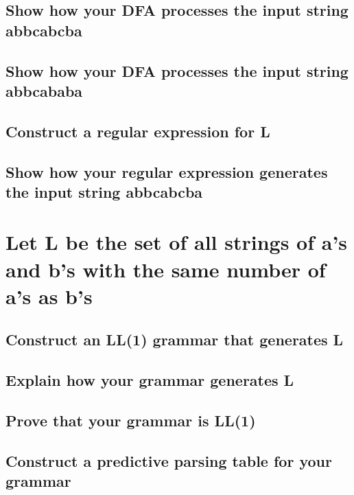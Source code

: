 \documentclass{article}
\begin{document}
\subsection[Input String: abbcabcba]{Show how your DFA processes the input string abbcabcba}

\subsection[Input String: abbcababa]{Show how your DFA processes the input string abbcababa}

\subsection[Regular Expression for L]{Construct a regular expression for L}

\subsection[Regular Expression generate: abbcabcba]{Show how your regular expression generates the input string abbcabcba}





\newpage
\section[Problem 3]{Let L be the set of all strings of a's and b's with the same number of a's as b's}
\subsection[LL1 Grammar]{Construct an LL(1) grammar that generates L}

\subsection[Generation Explanation]{Explain how your grammar generates L}

\subsection[Proof of LL(1)]{Prove that your grammar is LL(1) }

\subsection[Predictive Parser]{Construct a predictive parsing table for your grammar }
\end{document}
